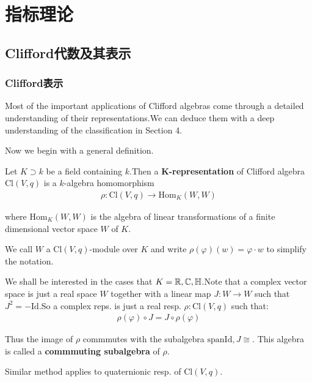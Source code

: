 \ifx\allfiles\undefined

	
	
\else
\fi
\part{指标理论}
\chapter{Clifford代数及其表示}
\section{Clifford表示}
 Most of the important applications of Clifford algebras come through a detailed understanding of their representations.We can deduce them with a deep understanding of the classification in Section 4.

 Now we begin with a general definition.
    
  \begin{definition}\label{def:reps}
  Let $K \supset k$ be a field containing $k$.Then a \textbf{K-representation} of Clifford algebra $\mathrm{Cl}(V,q)$ is a $k$-algebra homomorphism
    \begin{align*}
        \rho:\mathrm{Cl}(V,q) \to \mathrm{Hom}_{K}(W,W)
    \end{align*}

    where $\mathrm{Hom}_{K}(W,W)$ is the algebra of linear transformations of a finite dimensional vector space $W$ of $K$.

    We call $W$ a $\mathrm{Cl}(V,q)$-module over $K$ and write $\rho(\varphi)(w)=\varphi \cdot w$ to simplify the notation.
  \end{definition}



We shall be interested in the cases that $K=\mathbb{R},\mathbb{C},\mathbb{H}$.Note that a complex vector space is just a real space $W$ together with a linear map $J:W \to W$ such that $J^2=-\mathrm{Id}$.So a complex reps. is just a real resp. $\rho:\mathrm{Cl}(V,q)$ such that:
\begin{align*}
    \rho(\varphi)\circ J=J \circ \rho(\varphi)
\end{align*}

Thus the image of $\rho$ commmutes with the subalgebra $\mathrm{span}{\mathrm{Id},J}\cong $. This algebra is called a \textbf{commmuting subalgebra} of $\rho$.

Similar method applies to quaternionic resp. of $\mathrm{Cl}(V,q)$.


